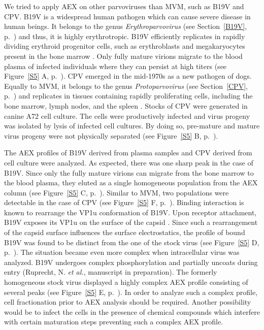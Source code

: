 We tried to apply AEX on other parvoviruses than MVM, such as B19V and CPV. B19V is a widespread human pathogen which can cause severe disease in human beings. It belongs to the genus \textit{Erythroparvovirus} (see Section~\ref{B19V}, p.~\pageref{B19V}) and thus, it is highly erythrotropic. B19V efficiently replicates in rapidly dividing erythroid progenitor cells, such as erythroblasts and megakaryocytes present in the bone marrow \cite{pmid12097253}. Only fully mature virions migrate to the blood plasma of infected individuals where they can persist at high titers (see Figure~\ref{S5} A, p.~\pageref{S5}). CPV emerged in the mid-1970s as a new pathogen of dogs. Equally to MVM, it belongs to the genus \textit{Protoparvovirus} (see Section~\ref{CPV}, p.~\pageref{CPV}) and replicates in tissues containing rapidly proliferating cells, including the bone marrow, lymph nodes, and the spleen \cite{pmid20152105}. Stocks of CPV were generated in canine A72 cell culture. The cells were productively infected and virus progeny was isolated by lysis of infected cell cultures. By doing so, pre-mature and mature virus progeny were not physically separated (see Figure~\ref{S5} B, p.~\pageref{S5}). 

The AEX profiles of B19V derived from plasma samples and CPV derived from cell culture were analyzed. As expected, there was one sharp peak in the case of B19V. Since only the fully mature virions can migrate from the bone marrow to the blood plasma, they eluted as a single homogeneous population from the AEX column (see Figure~\ref{S5} C, p.~\pageref{S5}). Similar to MVM, two populations were detectable in the case of CPV (see Figure~\ref{S5} F, p.~\pageref{S5}). Binding interaction is known to rearrange the VP1u conformation of B19V. Upon receptor attachment, B19V exposes its VP1u on the surface of the capsid \cite{pmid20826697}. Since such a rearrangement of the capsid surface influences the surface electrostatics, the profile of bound B19V was found to be distinct from the one of the stock virus (see Figure~\ref{S5} D, p.~\pageref{S5}). The situation became even more complex when intracellular virus was analyzed. B19V undergoes complex phosphorylation and partially uncoats during entry (Ruprecht, N. \textit{et al.}, manuscript in preparation). The formerly homogeneous stock virus displayed a highly complex AEX profile consisting of several peaks (see Figure~\ref{S5} E, p.~\pageref{S5}). In order to analyze such a complex profile, cell fractionation prior to AEX analysis should be required. Another possibility would be to infect the cells in the presence of chemical compounds which interfere with certain maturation steps preventing such a complex AEX profile. 

